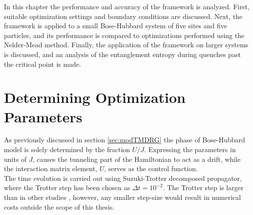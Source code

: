In this chapter the performance and accuracy of the framework is analyzed. First, suitable optimization settings and boundary conditions are discussed.
Next, the framework is applied to a small Bose-Hubbard system of five sites and five particles, and its performance is compared to optimizations performed using the Nelder-Mead method.
Finally, the application of the framework on larger systems is discussed, and an analysis of the entanglement entropy during quenches past the critical point is made. 


\section{Determining Optimization Parameters}

As previously discussed in section \ref{sec:modTMDRG} the phase of Bose-Hubbard model is solely determined by the fraction $U/J$. Expressing the parameters in units of $J$, causes the tunneling part of the Hamiltonian to act as a drift, while the interaction matrix element, $U$, serves as the control function.\\
The time evolution is carried out using Suzuki-Trotter decomposed propagator, where the Trotter step has been chosen as $\Delta t = 10^{-2}$. The Trotter step is larger than in other studies \cite{Doria2011,FrankBloch,Braun2015}, however, any smaller step-size would result in numerical costs outside the scope of this thesis.


